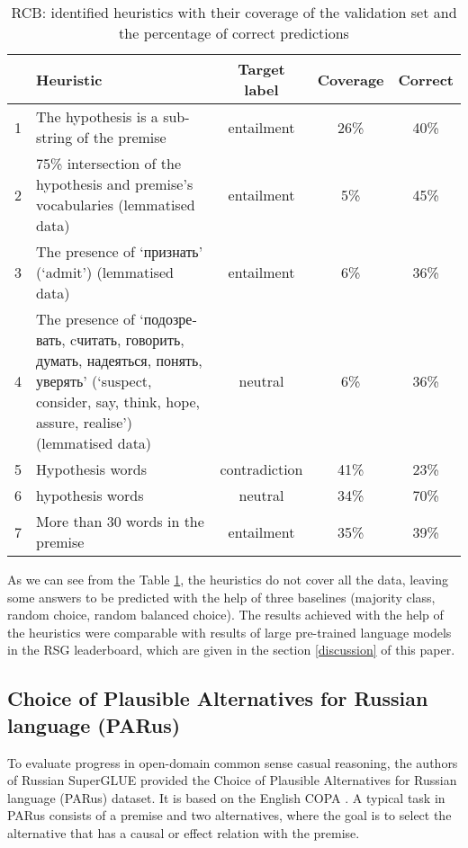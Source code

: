 \documentclass[11pt]{article}
\begin{document}
\begin{table}
\centering
\begin{tabular}{|c|p{}|c|c|c|}
\hline
 &\textbf{Heuristic} & \textbf{Target} \textbf{label} & \textbf{Coverage} & \textbf{Correct} \\
\hline
1 & The hypothesis is a sub-string of the premise & entailment & 26\% & 40\% \\
\hline
2 & 75\% intersection of the hypothesis and premise's vocabularies (lemmatised data)& entailment & 5\% & 45\% \\
\hline
3 & The presence of \foreignlanguage{russian}{`признать'} (`admit') (lemmatised data)& entailment & 6\% & 36\% \\
\hline
4 & The presence of \foreignlanguage{russian}{`подозревать, cчитать, говорить, думать, надеяться, понять, уверять'} (`suspect, consider, say, think, hope, assure, realise') (lemmatised data)& neutral & 6\% & 36\% \\
\hline
5 & Hypothesis  words & contradiction& 41\% & 23\%\\
\hline   
6 &  hypothesis  words & neutral & 34\% & 70\%\\
\hline
7 & More than 30 words in the premise & entailment & 35\% & 39\%\\
\hline 
\end{tabular}
\caption{RCB: identified heuristics with their coverage of the validation set and the percentage of correct predictions}
\label{table:RCB_heuristics}
\end{table}

As we can see from the Table \ref{table:RCB_heuristics}, the heuristics do not cover all the data, leaving some answers to be predicted with the help of three baselines (majority class, random choice, random balanced choice). The results achieved with the help of the heuristics were comparable with results of large pre-trained language models in the RSG leaderboard, which are given in the section \ref{discussion} of this paper. 


\subsection{Choice of Plausible Alternatives for Russian language (PARus)}
To evaluate progress in open-domain common sense casual reasoning, the authors of Russian SuperGLUE provided the Choice of Plausible Alternatives for Russian language (PARus) dataset. It is based on the English COPA \cite{roemmele2011choice}. A typical task in PARus consists of a premise and two alternatives, where the goal is to select the alternative that has a causal or effect relation with the premise. 
\end{document}
